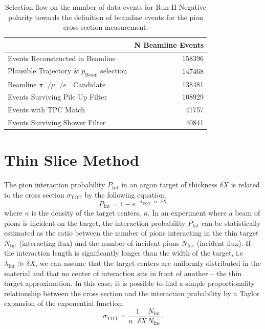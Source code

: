 \documentclass[aps,prl,twocolumn,showpacs,superscriptaddress,groupedaddress]{revtex4}  %
\begin{document}
\begin{table}
\caption{\label{tab:beamlineDataSelection}Selection flow on the number of data events for Run-II Negative polarity towards the definition of beamline events for the pion cross section measurement.}
\begin{ruledtabular}
\begin{tabular}{l|r}
                                                        &  N Beamline Events     \\ \hline
Events Reconstructed in Beamline        &  158396     \\ \hline
Plausible Trajectory \& $p_{\text{Beam}}$ selection       &   147468    \\ \hline
Beamline $\pi^-/\mu^-/e^-$  Candidate  &   138481    \\ \hline
Events Surviving Pile Up Filter              &   108929    \\ \hline
Events with TPC Match                         &    41757     \\ \hline
Events Surviving Shower Filter             &    40841     \\ 
\end{tabular}
\end{ruledtabular}
\end{table}



\section{\label{sec:ThinSliceMethod}Thin Slice Method}
The pion interaction probability $P_{\text{Int}}$ in an argon target of thickness $\delta X$  is related to the cross section $\sigma_{\text{TOT}}$ by the following equation, 
\begin{equation}
P_{\text{Int}} = 1- e^{-\sigma_{\text{TOT}}\text{ } n \text{ }\delta X}
\label{eq:thinTargetXS}
\end{equation}
where $n$ is the density of the target centers, $n$. In an experiment where a beam of pions is incident on the target, the interaction probability $P_{\text{Int}}$ can be statistically estimated as the ratio between the number of pions interacting in the thin target $N_{\text{Int}}$ (interacting flux) and the number of incident pions $N_{\text{Inc}}$ (incident flux). 
If the interaction length is significantly longer than the width of the target, i.e $\lambda_{\text{Int}} \gg \delta X$, we can assume that the target centers are uniformly distributed in the material and that no center of interaction sits in front of another -- the thin target approximation. In this case, it is possible to find a simple proportionality relationship between the cross section and the interaction probability by a Taylor expansion of the exponential function:
 \begin{equation}
 \sigma_{\text{TOT}}  = \frac{1}{n \text{ }\delta X}\frac{N_{\text{Int}}}{N_{\text{Inc}}}.
\label{eq:thinTargetXSSolved}
\end{equation}
\end{document}
